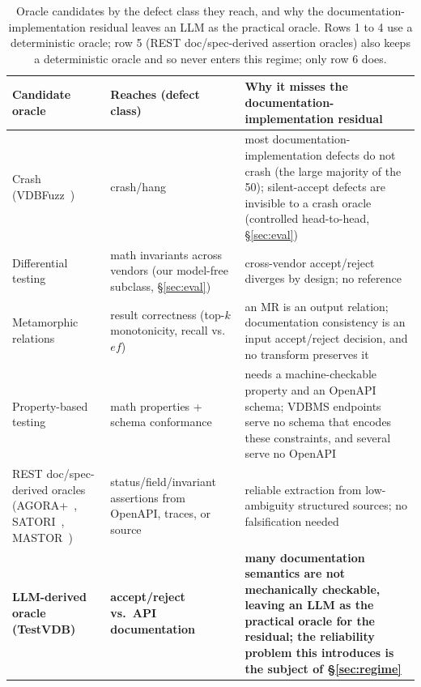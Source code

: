 \documentclass[sigconf]{acmart}
\begin{document}
\begin{table}[t]
\caption{Oracle candidates by the defect class they reach, and why the documentation-implementation residual leaves an LLM as the practical oracle. Rows 1 to 4 use a deterministic oracle; row 5 (REST doc/spec-derived assertion oracles) also keeps a deterministic oracle and so never enters this regime; only row 6 does.}
\label{tab:exclusion}
\small
\begin{tabular}{@{}p{}p{}p{}@{}}
\toprule
Candidate oracle & Reaches (defect class) & Why it misses the documentation-implementation residual \\
\midrule
Crash (VDBFuzz~\cite{vdbfuzz26}) & crash/hang & most documentation-implementation defects do not crash (the large majority of the 50); silent-accept defects are invisible to a crash oracle (controlled head-to-head, \S\ref{sec:eval}) \\
Differential testing & math invariants across vendors (our model-free subclass, \S\ref{sec:eval}) & cross-vendor accept/reject diverges by design; no reference~\cite{roadmap25} \\
Metamorphic relations~\cite{metmap24} & result correctness (top-$k$ monotonicity, recall vs.\ $ef$) & an MR is an output relation; documentation consistency is an input accept/reject decision, and no transform preserves it \\
Property-based testing~\cite{claessen00,schemathesis,quickrest20} & math properties + schema conformance & needs a machine-checkable property and an OpenAPI schema; VDBMS endpoints serve no schema that encodes these constraints, and several serve no OpenAPI \\
REST doc/spec-derived oracles (AGORA+~\cite{agoraplus25}, SATORI~\cite{satori25}, MASTOR~\cite{mastor26}) & status/field/invariant assertions from OpenAPI, traces, or source & reliable extraction from low-ambiguity structured sources; no falsification needed \\
\textbf{LLM-derived oracle (TestVDB)} & \textbf{accept/reject vs.\ API documentation} & \textbf{many documentation semantics are not mechanically checkable, leaving an LLM as the practical oracle for the residual; the reliability problem this introduces is the subject of \S\ref{sec:regime}} \\
\bottomrule
\end{tabular}
\end{table}
\end{document}
